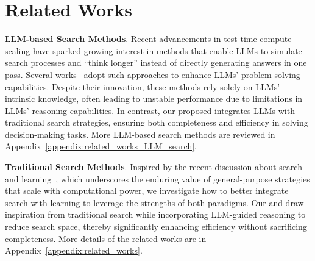 \section{Related Works}
\label{sec:related_works}
\textbf{LLM-based Search Methods}.  
Recent advancements in test-time compute scaling have sparked growing interest in methods that enable LLMs to simulate search processes and ``think longer'' instead of directly generating answers in one pass. Several works~\cite{wang2023selfconsistency,hao2023reasoning,feng2023alphazerolike,yao2023tree,zhao2024large,besta2024got,wang2024litesearch,snell2024scaling} adopt such approaches to enhance LLMs' problem-solving capabilities. 
Despite their innovation, these methods rely solely on LLMs' intrinsic knowledge, often leading to unstable performance due to limitations in LLMs' reasoning capabilities. In contrast, our proposed \method integrates LLMs with traditional search strategies, ensuring both completeness and efficiency in solving decision-making tasks. More LLM-based search methods are reviewed in Appendix~\ref{appendix:related_works_LLM_search}.

\noindent \textbf{Traditional Search Methods}.  
Inspired by the recent discussion about search and learning~\cite{Sutton2019BitterLesson}, which underscores the enduring value of general-purpose strategies that scale with computational power, we investigate how to better integrate search with learning to leverage the strengths of both paradigms. Our \method and \cmethod draw inspiration from traditional search while incorporating LLM-guided reasoning to reduce search space, thereby significantly enhancing efficiency without sacrificing completeness. More details of the related works are in Appendix~\ref{appendix:related_works}.